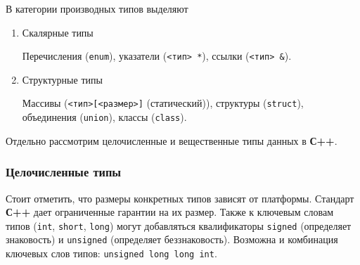 В категории производных типов выделяют

\begin{enumerate}
    \item
          Скалярные типы

          Перечисления (\texttt{enum}), указатели (\texttt{<тип> *}), ссылки (\texttt{<тип> \&}).
    \item
          Структурные типы

          Массивы (\texttt{<тип>[<размер>]} (статический)), структуры (\texttt{struct}), объединения (\texttt{union}), классы (\texttt{class}).
\end{enumerate}

Отдельно рассмотрим целочисленные и вещественные типы данных в
\textbf{С++}.

\subsubsection{Целочисленные типы}

Стоит отметить, что размеры конкретных типов зависят от платформы.
Стандарт \textbf{С++} дает ограниченные гарантии на их размер. Также к
ключевым словам типов (\texttt{int}, \texttt{short}, \texttt{long})
могут добавляться квалификаторы \texttt{signed} (определяет знаковость)
и \texttt{unsigned} (определяет беззнаковость). Возможна и комбинация
ключевых слов типов: \texttt{unsigned\ long\ long\ int}.

